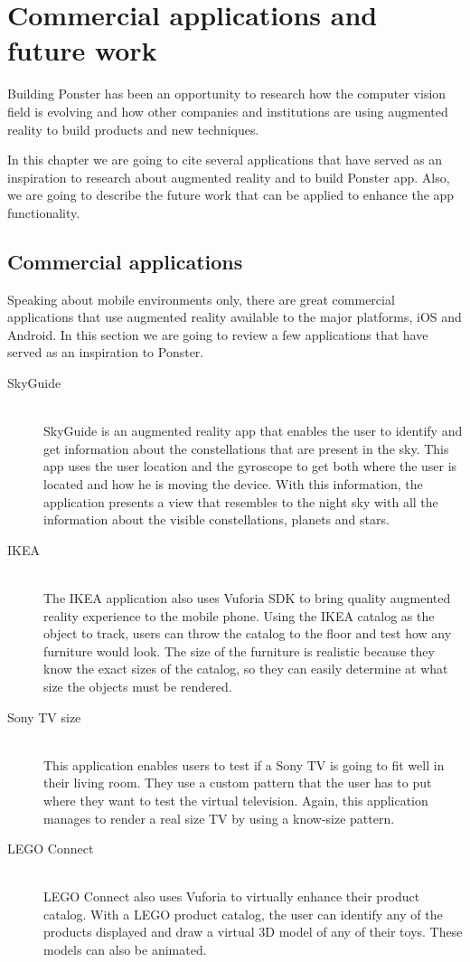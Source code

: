 \chapter{Commercial applications and future work}
Building Ponster has been an opportunity to research how the computer vision field is
evolving and how other companies and institutions are using augmented reality to
build products and new techniques. 

In this chapter we are going to cite several applications that have served as an
inspiration to research about augmented reality and to build Ponster app. Also, we
are going to describe the future work that can be applied to enhance the app
functionality. 

\section{Commercial applications}
\label{sec:comapps}
Speaking about mobile environments only, there are great commercial applications
that use augmented reality available to the major platforms, iOS and Android. In
this section we are going to review a few applications that have served as an
inspiration to Ponster. 

\begin{description}
\item [SkyGuide] \hfill \\
SkyGuide is an augmented reality app that enables the user to identify and get
information about the constellations that are present in the sky. This app uses the
user location and the gyroscope to get both where the user is located and how he is
moving the device. With this information, the application presents a view that
resembles to the night sky with all the information about the visible
constellations, planets and stars.

\item [IKEA] \hfill \\
The IKEA application also uses Vuforia SDK to bring quality augmented reality
experience to the mobile phone. Using the IKEA catalog as the object to track, users
can throw the catalog to the floor and test how any furniture would look. The size
of the furniture is realistic because they know the exact sizes of the catalog, so
they can easily determine at what size the objects must be rendered.

\item [Sony TV size] \hfill \\
This application enables users to test if a Sony TV is going to fit well in their
living room. They use a custom pattern that the user has to put where they want to
test the virtual television. Again, this application manages to render a real size
TV by using a know-size pattern.

\item [LEGO Connect] \hfill \\
LEGO Connect also uses Vuforia to virtually enhance their product catalog. With a
LEGO product catalog, the user can identify any of the products displayed and draw a
virtual 3D model of any of their toys. These models can also be animated.
\end{description}

